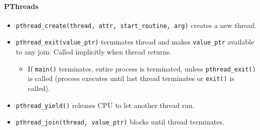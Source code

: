 \documentclass[twocolumn,english]{article}
\begin{document}
\paragraph{PThreads}
\begin{itemize}
\item \texttt{pthread\_create(thread, attr, start\_routine, arg)} creates
a new thread.
\item \texttt{pthread\_exit(value\_ptr)} terminates thread and makes \texttt{value\_ptr}
available to any join. Called implicitly when thread returns.
\begin{itemize}
\item If \texttt{main()} terminates, entire process is terminated, unless
\texttt{pthread\_exit()} is called (process executes until last thread
terminates or \texttt{exit()} is called).
\end{itemize}
\item \texttt{pthread\_yield()} releases CPU to let another thread run.
\item \texttt{pthread\_join(thread, value\_ptr)} blocks until thread terminates.
\end{itemize}
\end{document}
